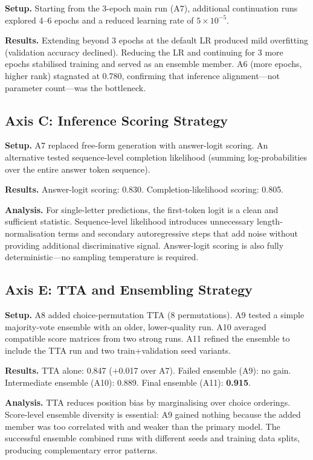 \documentclass[11pt,twocolumn]{article}
\begin{document}
\textbf{Setup.} Starting from the 3-epoch main run (A7), additional continuation runs explored 4--6 epochs and a reduced learning rate of $5\times10^{-5}$.

\textbf{Results.} Extending beyond 3 epochs at the default LR produced mild overfitting (validation accuracy declined). Reducing the LR and continuing for 3 more epochs stabilised training and served as an ensemble member. A6 (more epochs, higher rank) stagnated at 0.780, confirming that inference alignment---not parameter count---was the bottleneck.

\subsection{Axis C: Inference Scoring Strategy}

\textbf{Setup.} A7 replaced free-form generation with answer-logit scoring. An alternative tested sequence-level completion likelihood (summing log-probabilities over the entire answer token sequence).

\textbf{Results.} Answer-logit scoring: 0.830. Completion-likelihood scoring: 0.805.

\textbf{Analysis.} For single-letter predictions, the first-token logit is a clean and sufficient statistic. Sequence-level likelihood introduces unnecessary length-normalisation terms and secondary autoregressive steps that add noise without providing additional discriminative signal. Answer-logit scoring is also fully deterministic---no sampling temperature is required.

\subsection{Axis E: TTA and Ensembling Strategy}
\label{sec:ens-ablation}

\textbf{Setup.} A8 added choice-permutation TTA (8 permutations). A9 tested a simple majority-vote ensemble with an older, lower-quality run. A10 averaged compatible score matrices from two strong runs. A11 refined the ensemble to include the TTA run and two train+validation seed variants.

\textbf{Results.} TTA alone: 0.847 ($+$0.017 over A7). Failed ensemble (A9): no gain. Intermediate ensemble (A10): 0.889. Final ensemble (A11): \textbf{0.915}.

\textbf{Analysis.} TTA reduces position bias by marginalising over choice orderings. Score-level ensemble diversity is essential: A9 gained nothing because the added member was too correlated with and weaker than the primary model. The successful ensemble combined runs with different seeds and training data splits, producing complementary error patterns.
\end{document}
